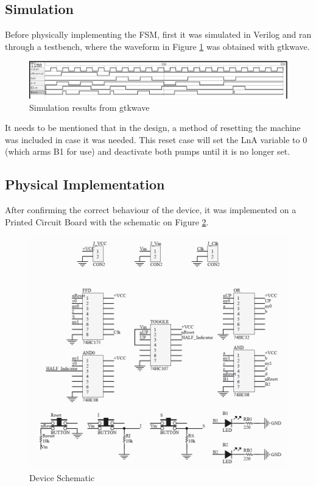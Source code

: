 \subsection{Simulation}

Before physically implementing the FSM, first it was simulated in Verilog and ran through a testbench, 
where the waveform in Figure \ref{fig:moore_gtk} was obtained with gtkwave.

\begin{figure}
    \begin{center}
        \includegraphics[width=\linewidth]{./gtkwave.png}
        \caption{Simulation results from gtkwave}
        \label{fig:moore_gtk}
    \end{center}
\end{figure}

It needs to be mentioned that in the design, a method of resetting the machine was included in case it was needed.
This reset case will set the LnA variable to 0 (which arms B1 for use) and deactivate both pumps until it is no longer
set.

\subsection{Physical Implementation}

After confirming the correct behaviour of the device, it was implemented on a Printed Circuit Board with the schematic
on Figure \ref{fig:moore_schem}.

\begin{figure}[ht]
    \begin{center}
        \includegraphics[width=\linewidth]{./schematic.png}
        \caption{Device Schematic}
        \label{fig:moore_schem}
    \end{center}
\end{figure}

